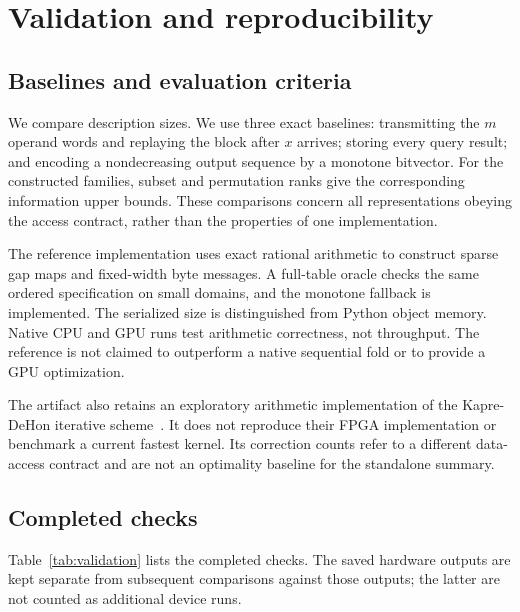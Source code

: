 \documentclass[11pt,reqno]{amsart}
\theoremstyle{definition}
\theoremstyle{remark}
\numberwithin{equation}{section}
\begin{document}
\section{Validation and reproducibility}\label{sec:validation}

\subsection{Baselines and evaluation criteria}

We compare description sizes. We use three exact baselines:
transmitting the $m$ operand words and replaying the block after $x$ arrives;
storing every query result; and encoding a nondecreasing output sequence by a
monotone bitvector. For the constructed families, subset and permutation ranks
give the corresponding information upper bounds. These comparisons concern
all representations obeying the access contract, rather than the properties
of one implementation.

The reference implementation uses exact rational arithmetic to construct
sparse gap maps and fixed-width byte messages. A full-table oracle checks the
same ordered specification on small domains, and the monotone fallback is
implemented. The serialized size is distinguished from Python object memory.
Native CPU and GPU runs test arithmetic correctness, not throughput. The
reference is not claimed to outperform a native sequential fold or to provide
a GPU optimization.

The artifact also retains an exploratory arithmetic implementation of the
Kapre-DeHon iterative scheme~\cite{ref4}. It does not reproduce their FPGA
implementation or benchmark a current fastest kernel. Its correction counts
refer to a different data-access contract and are not an optimality baseline
for the standalone summary.

\subsection{Completed checks}

Table~\ref{tab:validation} lists the completed checks. The saved hardware
outputs are kept separate from subsequent comparisons against those outputs;
the latter are not counted as additional device runs.
\end{document}
